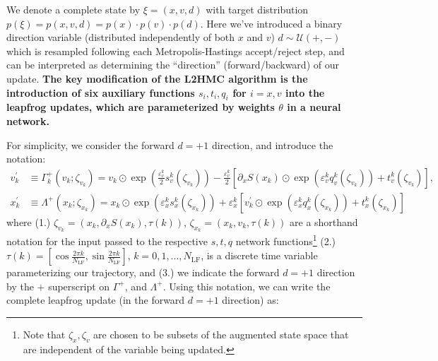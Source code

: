 \documentclass{article} %
\begin{document}
We denote a complete state by \(\xi = (x, v, d)\) with target distribution \(p(\xi) = p(x, v, d) = p(x)\cdot p(v)\cdot
p(d)\).
%
Here we've introduced a binary direction variable (distributed independently of both \(x\) and \(v\))
\(d\sim\mathcal{U}(+,-)\) which is resampled following each Metropolis-Hastings accept/reject step, and can be
interpreted as determining the ``direction'' (forward/backward) of our update.
%
\textbf{The key modification of the L2HMC algorithm is the introduction of six auxiliary functions \(s_{i}, t_{i}, q_{i}\) for \(i
= x, v\) into the leapfrog updates, which are parameterized by weights \(\theta\) in a neural network.}
%
%

For simplicity, we consider the forward \(d=+1\) direction, and introduce the notation:
%
\begin{align}
   v^{\prime}_{k} &\equiv \Gamma^{+}_{k}(v_{k};\zeta_{v_{k}})
   = v_{k}\odot \exp{\left(\tfrac{\varepsilon^{k}_{v}}{2}s_{v}^{k}(\zeta_{v_{k}})\right)} -
   \tfrac{\varepsilon^{k}_{v}}{2}{\left[\partial_{x}S(x_{k})\odot\exp{\left(\varepsilon^{k}_{v} q_{v}^{k}(\zeta_{v_{k}})\right)}
      +t_{v}^{k}(\zeta_{v_{k}})\right]},\label{eq:new_momentum_update}\\
   x^{\prime}_{k} &\equiv \Lambda^{+}(x_{k};\zeta_{x_{k}})
   = x_{k}\odot\exp(\varepsilon^{k}_{x} s^{k}_{x}(\zeta_{x_{k}}))
   + \varepsilon^{k}_{x}\left[v^{\prime}_{k}\odot\exp(\varepsilon^{k}_{x} q^{k}_{x}(\zeta_{x_{k}}))
         + t^{k}_{x}(\zeta_{x_{k}})\right]\label{eq:new_position_update}
\end{align}
%
where (1.) \(\zeta_{v_{k}} = (x_{k}, \partial_{x}S(x_{k}), \tau(k))\), \(\zeta_{x_{k}} = (x_{k}, v_{k}, \tau(k))\) are a
shorthand notation for the input passed to the respective \(s, t, q\) network functions\footnote{Note that \(\zeta_{x},
\zeta_{v}\) are chosen to be subsets of the augmented state space that are independent of the variable being updated.}
(2.) \(\tau(k) = {\left[\cos\tfrac{2\pi k}{N_{\mathrm{LF}}}, \sin\tfrac{2\pi k}{N_{\mathrm{LF}}}\right]}\), \(k = 0, 1,
\ldots, N_{\mathrm{LF}}\), is a discrete time variable parameterizing our trajectory, and (3.) we indicate the forward
\(d=+1\) direction by the \(+\) superscript on \(\Gamma^{+}\), and \(\Lambda^{+}\).
%
Using this notation, we can write the complete leapfrog update (in the forward \(d=+1\) direction) as:
%
\end{document}
